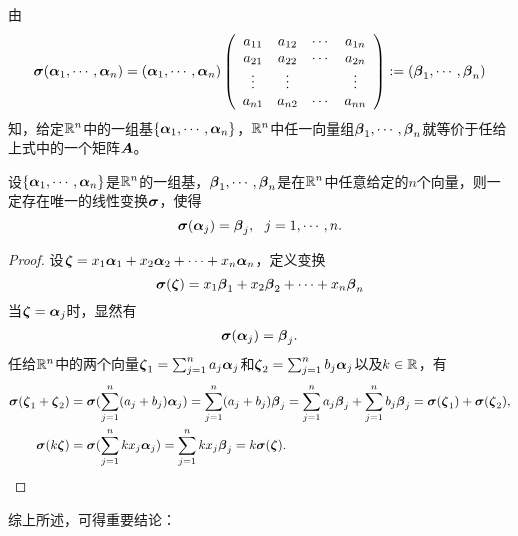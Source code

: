 \begin{frame}
  由
  $$
  \boldsymbol{\sigma}(\boldsymbol{\alpha}_1,\cdots,\boldsymbol{\alpha}_n)=(\boldsymbol{\alpha}_1,\cdots,\boldsymbol{\alpha}_n)\left(
    \begin{array}{cccc}
      a_{11}&a_{12}&\cdots&a_{1n}\\
      a_{21}&a_{22}&\cdots&a_{2n}\\
      \vdots&\vdots&&\vdots\\
      a_{n1}&a_{n2}&\cdots&a_{nn}
    \end{array}
  \right):=(\boldsymbol{\beta}_1,\cdots,\boldsymbol{\beta}_n)
  $$
  知，给定$\mathbb R^n$中的一组基$\{\boldsymbol{\alpha}_1,\cdots,\boldsymbol{\alpha}_n\}$，$\mathbb R^n$中任一向量组$\boldsymbol{\beta}_1,\cdots,\boldsymbol{\beta}_n$就等价于任给上式中的一个矩阵$\boldsymbol{A}$。\vspace{.1in}\pause 

\end{frame}


\begin{frame}
  \begin{dingli}
    设$\{\boldsymbol{\alpha}_1,\cdots,\boldsymbol{\alpha}_n\}$是$\mathbb R^n$的一组基，$\boldsymbol{\beta}_1,\cdots,\boldsymbol{\beta}_n$是在$\mathbb R^n$中任意给定的$n$个向量，则一定存在唯一的线性变换$\boldsymbol{\sigma}$，使得
    $$
    \boldsymbol{\sigma}(\boldsymbol{\alpha}_j)=\boldsymbol{\beta}_j, ~~ j=1,\cdots,n.
    $$
  \end{dingli} \vspace{.1in} \pause 

  \begin{proof}
     \vspace{.1in}

    设$\boldsymbol{\zeta}=x_1\boldsymbol{\alpha}_1+x_2\boldsymbol{\alpha}_2+\cdots+x_n\boldsymbol{\alpha}_n$，定义变换
    $$
    \boldsymbol{\sigma}(\boldsymbol{\zeta})=x_1\boldsymbol{\beta}_1+x_2\boldsymbol{\beta}_2+\cdots+x_n\boldsymbol{\beta}_n
    $$\pause 
    当$\boldsymbol{\zeta}=\boldsymbol{\alpha}_j$时，显然有
    $$
    \boldsymbol{\sigma}(\boldsymbol{\alpha}_j)=\boldsymbol{\beta}_j.
    $$\vspace{.1in} \pause 
    任给$\mathbb R^n$中的两个向量$\boldsymbol{\zeta}_1=\sum_{j=1}^na_j\boldsymbol{\alpha}_j$和$\boldsymbol{\zeta}_2=\sum_{j=1}^nb_j\boldsymbol{\alpha}_j$以及$k\in \mathbb R$，有
    $$
    \begin{aligned}
      \boldsymbol{\sigma}(\boldsymbol{\zeta}_1+\boldsymbol{\zeta}_2)&=\boldsymbol{\sigma}(\sum_{j=1}^n(a_j+b_j)\boldsymbol{\alpha}_j)
      =\sum_{j=1}^n(a_j+b_j)\boldsymbol{\beta}_j=\sum_{j=1}^na_j\boldsymbol{\beta}_j+\sum_{j=1}^nb_j\boldsymbol{\beta}_j=\boldsymbol{\sigma}(\boldsymbol{\zeta}_1)+\boldsymbol{\sigma}(\boldsymbol{\zeta}_2), \\
      \boldsymbol{\sigma}(k\boldsymbol{\zeta})&=\boldsymbol{\sigma}(\sum_{j=1}^nkx_j\boldsymbol{\alpha}_j)=\sum_{j=1}^nkx_j\boldsymbol{\beta}_j=k\boldsymbol{\sigma}(\boldsymbol{\zeta}).
    \end{aligned}
    $$ 
  \end{proof}
\end{frame}


\begin{frame}
  综上所述，可得重要结论：

\end{frame}